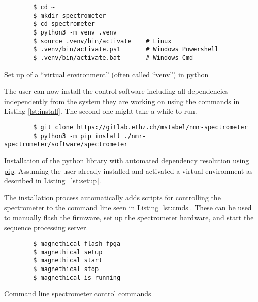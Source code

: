 \begin{listing}[h!bt]
    \begin{verbatim}
        $ cd ~
        $ mkdir spectrometer
        $ cd spectrometer
        $ python3 -m venv .venv
        $ source .venv/bin/activate    # Linux
        $ .venv/bin/activate.ps1       # Windows Powershell
        $ .venv/bin/activate.bat       # Windows Cmd
    \end{verbatim}
    \caption{Set up of a \enquote{virtual environment} (often called \enquote{venv}) in \gls{python}}
    \label{lst:setup}
\end{listing}

The user can now install the control software including all dependencies independently from the system they are working on using the commands in Listing \ref{lst:install}. The second one might take a while to run.

\begin{listing}[h!bt]
    \begin{verbatim}
        $ git clone https://gitlab.ethz.ch/mstabel/nmr-spectrometer
        $ python3 -m pip install ./nmr-spectrometer/software/spectrometer
    \end{verbatim}
    \caption{Installation of the python library with automated dependency resolution using \href{https://pypi.org/project/pip/}{\acrshort{pip}}. Assuming the user already installed and activated a virtual environment as described in Listing~\ref{lst:setup}.}
    \label{lst:install}
\end{listing}

The installation process automatically adds scripts for controlling the spectrometer to the command line seen in Listing \ref{lst:cmds}. These can be used to manually flash the firmware, set up the spectrometer hardware, and start the sequence processing server.

\begin{listing}[h!bt]
    \begin{verbatim}
        $ magnethical flash_fpga
        $ magnethical setup
        $ magnethical start
        $ magnethical stop
        $ magnethical is_running
    \end{verbatim}
    \caption{Command line spectrometer control commands}
    \label{lst:cmds}
\end{listing}

